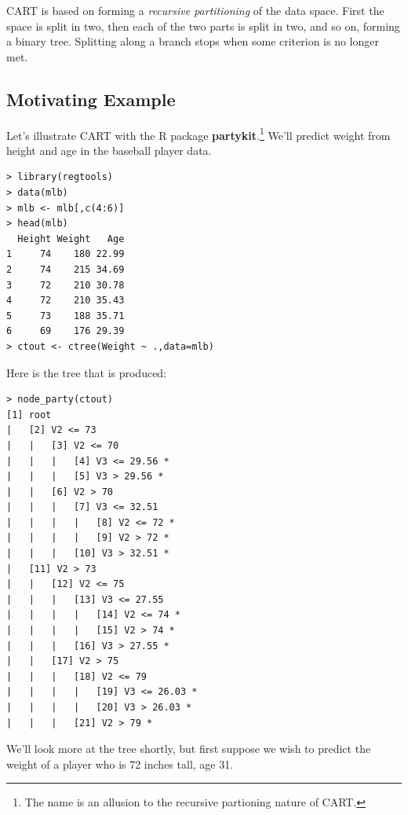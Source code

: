 CART is based on forming a \textit{recursive partitioning} of the data
space.  First the space is split in two, then each of the two parts is
split in two, and so on, forming a binary tree.  Splitting along a
branch stops when some criterion is no longer met.

\subsection{Motivating Example}

Let's illustrate CART with the R package \textbf{partykit}.\footnote{The
name is an allusion to the recursive partioning nature of CART.}  We'll
predict weight from height and age in the baseball player data.

\begin{lstlisting}
> library(regtools) 
> data(mlb) 
> mlb <- mlb[,c(4:6)] 
> head(mlb)
  Height Weight   Age
1     74    180 22.99
2     74    215 34.69
3     72    210 30.78
4     72    210 35.43
5     73    188 35.71
6     69    176 29.39
> ctout <- ctree(Weight ~ .,data=mlb) 
\end{lstlisting}

Here is the tree that is produced:

\begin{lstlisting}
> node_party(ctout) 
[1] root
|   [2] V2 <= 73
|   |   [3] V2 <= 70
|   |   |   [4] V3 <= 29.56 *
|   |   |   [5] V3 > 29.56 *
|   |   [6] V2 > 70
|   |   |   [7] V3 <= 32.51
|   |   |   |   [8] V2 <= 72 *
|   |   |   |   [9] V2 > 72 *
|   |   |   [10] V3 > 32.51 *
|   [11] V2 > 73
|   |   [12] V2 <= 75
|   |   |   [13] V3 <= 27.55
|   |   |   |   [14] V2 <= 74 *
|   |   |   |   [15] V2 > 74 *
|   |   |   [16] V3 > 27.55 *
|   |   [17] V2 > 75
|   |   |   [18] V2 <= 79
|   |   |   |   [19] V3 <= 26.03 *
|   |   |   |   [20] V3 > 26.03 *
|   |   |   [21] V2 > 79 *
\end{lstlisting}

We'll look more at the tree shortly, but first suppose we wish to
predict the weight of a player who is 72 inches tall, age 31.


